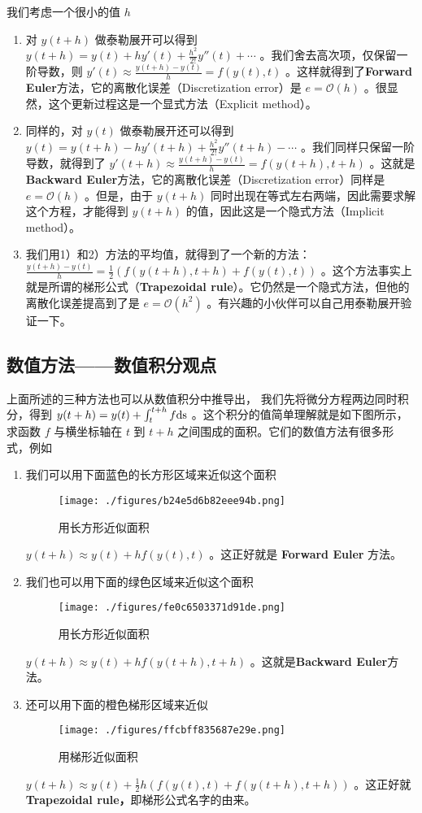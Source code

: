 我们考虑一个很小的值 $h$ 
\begin{enumerate}
\item 对 $y(t+h)$ 做泰勒展开可以得到 $y(t+h)=y(t)+hy'(t)+\frac{h^2}{2!}y''(t)+\cdots$ 。我们舍去高次项，仅保留一阶导数，则 $y'(t)\approx \frac{y(t+h)-y(t)}{h}= f(y(t),t)$ 。这样就得到了\textbf{Forward Euler}方法，它的离散化误差（Discretization error）是 $e=\mathcal{O}(h)$ 。很显然，这个更新过程这是一个显式方法（Explicit method）。
\item 同样的，对 $y(t)$ 做泰勒展开还可以得到 $y(t)=y(t+h)-hy'(t+h)+\frac{h^2}{2!}y''(t+h)-\cdots$ 。我们同样只保留一阶导数，就得到了 $y'(t+h)\approx \frac{y(t+h)-y(t)}{h}= f(y(t+h),t+h)$ 。这就是\textbf{Backward Euler}方法，它的离散化误差（Discretization error）同样是 $e=\mathcal{O}(h)$ 。但是，由于 $y(t+h)$ 同时出现在等式左右两端，因此需要求解这个方程，才能得到 $y(t+h)$ 的值，因此这是一个隐式方法（Implicit method）。
\item 我们用1）和2）方法的平均值，就得到了一个新的方法： $ \frac{y(t+h)-y(t)}{h}= \frac{1}{2}\left(f(y(t+h),t+h)+f(y(t),t)\right)$ 。这个方法事实上就是所谓的梯形公式（\textbf{Trapezoidal rule}）。它仍然是一个隐式方法，但他的离散化误差提高到了是 $e=\mathcal{O}(h^2)$ 。有兴趣的小伙伴可以自己用泰勒展开验证一下。
\end{enumerate}


\subsection{数值方法——数值积分观点}

上面所述的三种方法也可以从数值积分中推导出， 我们先将微分方程两边同时积分，得到 $y(t+h)=y(t)+\int_t^{t+h}f \rm{d}s$ 。这个积分的值简单理解就是如下图所示，求函数 $f$ 与横坐标轴在 $t$ 到 $t+h$ 之间围成的面积。它们的数值方法有很多形式，例如

\begin{enumerate}
\item 我们可以用下面蓝色的长方形区域来近似这个面积
\begin{figure}[ht]
\centering
\texttt{[image: ./figures/b24e5d6b82eee94b.png]}
\caption{用长方形近似面积} \label{fig_NordEq_1}
\end{figure}
$y(t+h)\approx y(t)+hf(y(t),t)$ 。这正好就是 \textbf{Forward Euler }方法。
\item 我们也可以用下面的绿色区域来近似这个面积
\begin{figure}[ht]
\centering
\texttt{[image: ./figures/fe0c6503371d91de.png]}
\caption{用长方形近似面积} \label{fig_NordEq_2}
\end{figure}
$y(t+h)\approx y(t)+hf(y(t+h),t+h)$ 。这就是\textbf{Backward Euler}方法。
\item 还可以用下面的橙色梯形区域来近似
\begin{figure}[ht]
\centering
\texttt{[image: ./figures/ffcbff835687e29e.png]}
\caption{用梯形近似面积} \label{fig_NordEq_3}
\end{figure}
$y(t+h)\approx y(t)+\frac{1}{2}h\left(f(y(t),t)+f(y(t+h),t+h)\right)$ 。这正好就\textbf{Trapezoidal rule，}即梯形公式名字的由来。
\end{enumerate}


